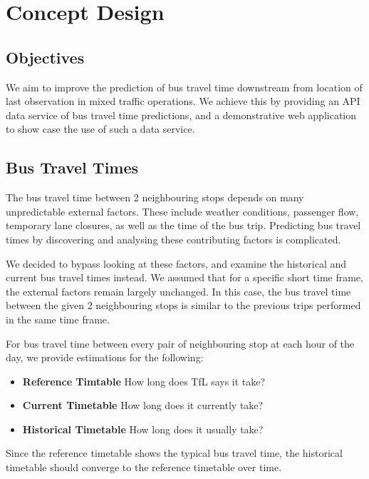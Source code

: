 \chapter{Concept Design}
\section{Objectives}
\par We aim to improve the prediction of bus travel time downstream from location of last observation in mixed traffic operations. We achieve this by providing an API data service of bus travel time predictions, and a demonstrative web application to show case the use of such a data service.

\section{Bus Travel Times}
\par The bus travel time between 2 neighbouring stops depends on many unpredictable external factors. These include weather conditions, passenger flow, temporary lane closures, as well as the time of the bus trip. Predicting bus travel times by discovering and analysing these contributing factors is complicated.

\par We decided to bypass looking at these factors, and examine the historical and current bus travel times instead. We assumed that for a specific short time frame, the external factors remain largely unchanged. In this case, the bus travel time between the given 2 neighbouring stops is similar to the previous trips performed in the same time frame.

\par For bus travel time between every pair of neighbouring stop at each hour of the day, we provide estimations for the following:
\begin{itemize}
  \item \textbf{Reference Timtable} How long does TfL says it take?
  \item \textbf{Current Timetable} How long does it currently take?
  \item \textbf{Historical Timetable} How long does it usually take?
\end{itemize}

\par Since the reference timetable shows the typical bus travel time, the historical timetable should converge to the reference timetable over time.

